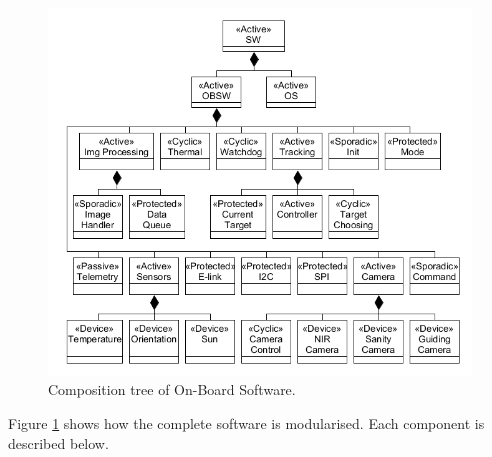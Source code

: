 \begin{figure}[H]
	\centering
	\includegraphics[width=\textwidth]{4-experiment-design/img/software/composition-tree.png}
	\caption{Composition tree of On-Board Software.}
	\label{fig:software-composition-tree}
\end{figure}

Figure \ref{fig:software-composition-tree} shows how the complete software is modularised. Each component is described below.

